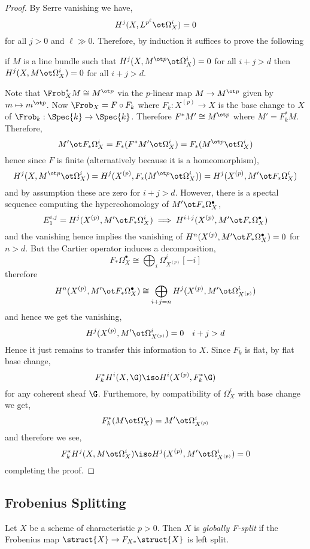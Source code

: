 \documentclass[12pt]{article}
\begin{document}
\begin{proof}
By Serre vanishing we have,
\[ H^j(X, L^{p^\ell} \ot \Omega_X^i) = 0 \]
for all $j > 0$ and $\ell \gg 0$. Therefore, by induction it suffices to prove the following
\begin{center}
if $M$ is a line bundle such that $H^j(X, M^{\ot p} \ot \Omega^i_X) = 0$ for all $i + j > d$ then $H^j(X, M \ot \Omega_X^i) = 0$ for all $i + j > d$.
\end{center}
Note that $\Frob_X^* M \cong M^{\ot p}$ via the $p$-linear map $M \to M^{\ot p}$ given by $m \mapsto m^{\ot p}$. Now $\Frob_X = F \circ F_k$ where $F_k : X^{(p)} \to X$ is the base change to $X$ of $\Frob_k : \Spec{k} \to \Spec{k}$. Therefore $F^* M' \cong M^{\ot p}$ where $M' = F_k^* M$. Therefore,
\[ M' \ot F_* \Omega_X^i = F_* (F^* M' \ot \Omega^i_X) = F_* (M^{\ot p} \ot \Omega^i_X) \]
hence since $F$ is finite (alternatively because it is a homeomorphism),
\[ H^j(X, M^{\ot p} \ot \Omega^i_X) = H^j(X^{(p)}, F_* (M^{\ot p} \ot \Omega^i_X)) = H^j(X^{(p)}, M' \ot F_* \Omega_X^i) \]
and by assumption these are zero for $i + j > d$. However, there is a spectal sequence computing the hypercohomology of $M' \ot F_* \Omega^\bullet_X$,
\[ E_1^{i,j} = H^j(X^{(p)}, M' \ot F_* \Omega_X^i) \implies H^{i+j}(X^{(p)}, M' \ot F_* \Omega_X^\bullet) \]
and the vanishing hence implies the vanishing of $H^n(X^{(p)}, M' \ot F_* \Omega^\bullet_X) = 0$ for $n > d$. But the Cartier operator induces a decomposition,
\[ F_* \Omega_X^\bullet \cong \bigoplus_i \Omega_{X^{(p)}}^i[-i] \]
therefore
\[ H^{n}(X^{(p)}, M' \ot F_* \Omega_X^\bullet) \cong \bigoplus_{i + j = n} H^j(X^{(p)}, M' \ot \Omega_{X^{(p)}}^i) \]
and hence we get the vanishing,
\[ H^j(X^{(p)}, M' \ot \Omega_{X^{(p)}}^i) = 0 \quad i + j > d \]
Hence it just remains to transfer this information to $X$. Since $F_k$ is flat, by flat base change, 
\[ F^*_k H^i(X, \G) \iso H^i(X^{(p)}, F_k^* \G) \]  
for any coherent sheaf $\G$. Furthemore, by compatibility of $\Omega_X^i$ with base change we get,
\[ F_k^* (M \ot \Omega_X^i) = M' \ot \Omega_{X^{(p)}}^i \]
and therefore we see,
\[ F_k^* H^j(X, M \ot \Omega_X^i) \iso H^j(X^{(p)}, M' \ot \Omega_{X^{(p)}}^i) = 0 \]
completing the proof.
\end{proof}

\subsection{Frobenius Splitting}

\begin{defn}
Let $X$ be a scheme of characteristic $p > 0$. Then $X$ is \textit{globally F-split} if the Frobenius map $\struct{X} \to F_{X*} \struct{X}$ is left split. 
\end{defn}
\end{document}

